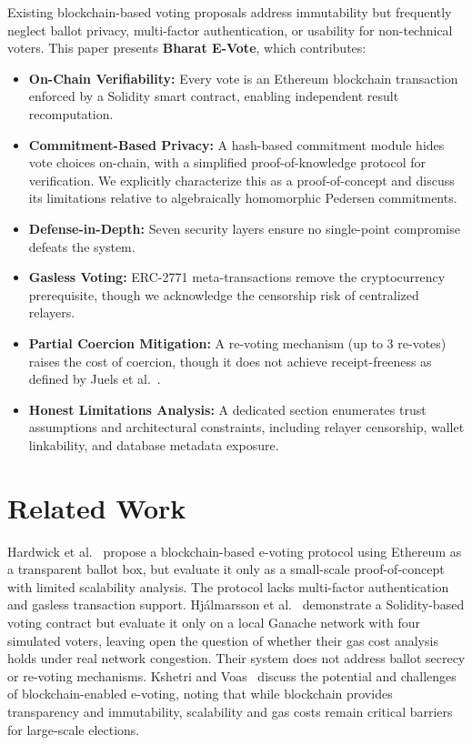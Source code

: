 \documentclass[conference]{IEEEtran}
\begin{document}
Existing blockchain-based voting proposals address immutability but frequently neglect ballot privacy, multi-factor authentication, or usability for non-technical voters. This paper presents \textbf{Bharat E-Vote}, which contributes:

\begin{itemize}[leftmargin=*]
    \item \textbf{On-Chain Verifiability:} Every vote is an Ethereum blockchain transaction enforced by a Solidity smart contract, enabling independent result recomputation.
    \item \textbf{Commitment-Based Privacy:} A hash-based commitment module hides vote choices on-chain, with a simplified proof-of-knowledge protocol for verification. We explicitly characterize this as a proof-of-concept and discuss its limitations relative to algebraically homomorphic Pedersen commitments.
    \item \textbf{Defense-in-Depth:} Seven security layers ensure no single-point compromise defeats the system.
    \item \textbf{Gasless Voting:} ERC-2771 meta-transactions remove the cryptocurrency prerequisite, though we acknowledge the censorship risk of centralized relayers.
    \item \textbf{Partial Coercion Mitigation:} A re-voting mechanism (up to 3 re-votes) raises the cost of coercion, though it does not achieve receipt-freeness as defined by Juels et al.~\cite{juels2005}.
    \item \textbf{Honest Limitations Analysis:} A dedicated section enumerates trust assumptions and architectural constraints, including relayer censorship, wallet linkability, and database metadata exposure.
\end{itemize}

\section{Related Work}

Hardwick et al.~\cite{hardwick2018} propose a blockchain-based e-voting protocol using Ethereum as a transparent ballot box, but evaluate it only as a small-scale proof-of-concept with limited scalability analysis. The protocol lacks multi-factor authentication and gasless transaction support. Hj{\'a}lmarsson et al.~\cite{hjalmarsson2018} demonstrate a Solidity-based voting contract but evaluate it only on a local Ganache network with four simulated voters, leaving open the question of whether their gas cost analysis holds under real network congestion. Their system does not address ballot secrecy or re-voting mechanisms. Kshetri and Voas~\cite{kshetri2018} discuss the potential and challenges of blockchain-enabled e-voting, noting that while blockchain provides transparency and immutability, scalability and gas costs remain critical barriers for large-scale elections.
\end{document}
